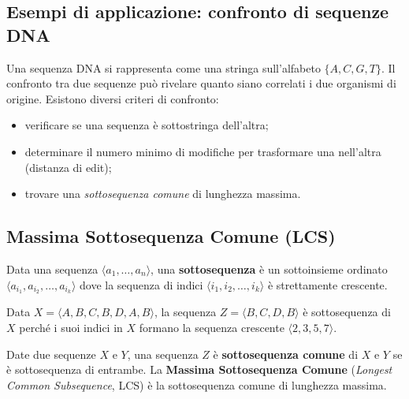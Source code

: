\subsection{Esempi di applicazione: confronto di sequenze DNA}

\begin{softnote}
Una sequenza DNA si rappresenta come una stringa sull'alfabeto $\{A, C, G, T\}$.
Il confronto tra due sequenze può rivelare quanto siano correlati i due organismi
di origine. Esistono diversi criteri di confronto:
\begin{itemize}
	\item verificare se una sequenza è sottostringa dell'altra;
	\item determinare il numero minimo di modifiche per trasformare una nell'altra
	(distanza di edit);
	\item trovare una \emph{sottosequenza comune} di lunghezza massima.
\end{itemize}
\end{softnote}

\subsection{Massima Sottosequenza Comune (LCS)}

\begin{definizione}[Sottosequenza]
Data una sequenza $\langle a_1, \ldots, a_n \rangle$, una \textbf{sottosequenza} è un
sottoinsieme ordinato $\langle a_{i_1}, a_{i_2}, \ldots, a_{i_k} \rangle$ dove la
sequenza di indici $\langle i_1, i_2, \ldots, i_k \rangle$ è strettamente crescente.
\end{definizione}

\begin{esempio}[Sottosequenza]
Data $X = \langle A, B, C, B, D, A, B \rangle$, la sequenza
$Z = \langle B, C, D, B \rangle$ è sottosequenza di $X$ perché i suoi indici in $X$
formano la sequenza crescente $\langle 2, 3, 5, 7 \rangle$.
\end{esempio}

\begin{definizione}
Date due sequenze $X$ e $Y$, una sequenza $Z$ è \textbf{sottosequenza comune} di $X$
e $Y$ se è sottosequenza di entrambe. La \textbf{Massima Sottosequenza Comune}
(\emph{Longest Common Subsequence}, LCS) è la sottosequenza comune di lunghezza
massima.
\end{definizione}


